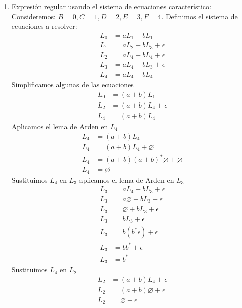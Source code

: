 \documentclass{article}
\begin{document}
\begin{enumerate}
{\begin{enumerate}
    			\item {
                Expresión regular usando el sistema de ecuaciones característico:
    			\\
                Consideremos: $B = 0, C = 1, D = 2, E = 3, F= 4$.
                Definimos el sistema de ecuaciones a resolver:
    			\begin{align*}
    				L_{0} &= aL_{1} + bL_{1}\\
    				L_{1} &= aL_{2} + bL_{3} + \epsilon\\
    				L_{2} &= aL_{4} + bL_{4} + \epsilon\\
    				L_{3} &= aL_{4} + bL_{3} + \epsilon\\
    				L_{4} &= aL_{4} + bL_{4}
    			\end{align*}
    			Simplificamos algunas de las ecuaciones
    			\begin{align*}
    				L_{0} &= (a+b)L_{1}\\
    				L_{2} &= (a+b)L_{4} + \epsilon\\
    				L_{4} &= (a+b)L_{4}
    			\end{align*}
    			Aplicamos el lema de Arden en $L_{4}$
    			\begin{align*}
					L_{4} &= (a+b)L_{4}\\
					L_{4} &= (a+b)L_{4} + \varnothing \\
					L_{4} &= (a+b)(a+b)^*\varnothing + \varnothing \\
					L_{4} &= \varnothing
    			\end{align*}
    			Sustituimos $L_{4}$ en $L_{3}$ aplicamos el lema de Arden en $L_{3}$
    			\begin{align*}
    				L_{3} &= aL_{4} + bL_{3} + \epsilon\\
					L_{3} &= a\varnothing + bL_{3} + \epsilon\\
					L_{3} &= \varnothing + bL_{3} + \epsilon\\
					L_{3} &= bL_{3} + \epsilon\\
					L_{3} &= b(b^*\epsilon) + \epsilon\\
					L_{3} &= bb^* + \epsilon\\
					L_{3} &= b^*
    			\end{align*}
    			Sustituimos $L_{4}$ en $L_{2}$
    			\begin{align*}
    				L_{2} &= (a+b)L_{4} + \epsilon\\
    				L_{2} &= (a+b)\varnothing + \epsilon\\
    				L_{2} &= \varnothing + \epsilon \\

\end{align*}}
\end{enumerate}}
\end{enumerate}
\end{document}
